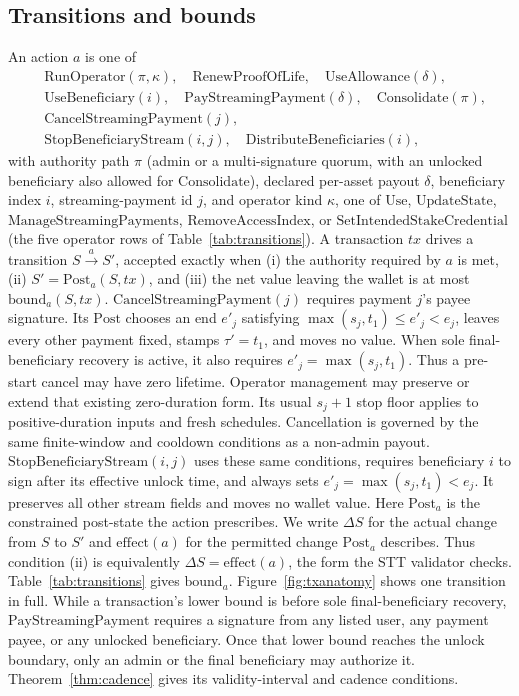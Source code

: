 \documentclass[11pt,DIV=11,parskip=half-]{scrartcl}
\begin{document}
\subsection{Transitions and bounds}
\begin{definition}[Transition]
An action $a$ is one of
\[
\begin{aligned}
&\mathrm{RunOperator}(\pi, \kappa),\quad \mathrm{RenewProofOfLife},\quad \mathrm{UseAllowance}(\delta),\\
&\mathrm{UseBeneficiary}(i),\quad \mathrm{PayStreamingPayment}(\delta),\quad \mathrm{Consolidate}(\pi),\\
&\mathrm{CancelStreamingPayment}(j),\\
&\mathrm{StopBeneficiaryStream}(i,j),\quad \mathrm{DistributeBeneficiaries}(i),
\end{aligned}
\]
with authority path $\pi$ (admin or a multi-signature quorum, with an unlocked beneficiary also allowed for $\mathrm{Consolidate}$), declared per-asset payout $\delta$, beneficiary index $i$, streaming-payment id $j$, and operator kind $\kappa$, one of $\mathrm{Use}$, $\mathrm{UpdateState}$, $\mathrm{ManageStreamingPayments}$, $\mathrm{RemoveAccessIndex}$, or $\mathrm{SetIntendedStakeCredential}$ (the five operator rows of Table~\ref{tab:transitions}). A transaction $\mathit{tx}$ drives a transition $S \xrightarrow{a} S'$, accepted exactly when (i) the authority required by $a$ is met, (ii) $S' = \mathrm{Post}_a(S, \mathit{tx})$, and (iii) the net value leaving the wallet is at most $\mathrm{bound}_a(S, \mathit{tx})$. $\mathrm{CancelStreamingPayment}(j)$ requires payment $j$'s payee signature. Its $\mathrm{Post}$ chooses an end $e'_j$ satisfying $\max(s_j,t_1) \le e'_j < e_j$, leaves every other payment fixed, stamps $\tau'=t_1$, and moves no value. When sole final-beneficiary recovery is active, it also requires $e'_j=\max(s_j,t_1)$. Thus a pre-start cancel may have zero lifetime. Operator management may preserve or extend that existing zero-duration form. Its usual $s_j+1$ stop floor applies to positive-duration inputs and fresh schedules. Cancellation is governed by the same finite-window and cooldown conditions as a non-admin payout. $\mathrm{StopBeneficiaryStream}(i,j)$ uses these same conditions, requires beneficiary $i$ to sign after its effective unlock time, and always sets $e'_j=\max(s_j,t_1)<e_j$. It preserves all other stream fields and moves no wallet value. Here $\mathrm{Post}_a$ is the constrained post-state the action prescribes. We write $\Delta S$ for the actual change from $S$ to $S'$ and $\mathrm{effect}(a)$ for the permitted change $\mathrm{Post}_a$ describes. Thus condition (ii) is equivalently $\Delta S = \mathrm{effect}(a)$, the form the STT validator checks. Table~\ref{tab:transitions} gives $\mathrm{bound}_a$. Figure~\ref{fig:txanatomy} shows one transition in full. While a transaction's lower bound is before sole final-beneficiary recovery, $\mathrm{PayStreamingPayment}$ requires a signature from any listed user, any payment payee, or any unlocked beneficiary. Once that lower bound reaches the unlock boundary, only an admin or the final beneficiary may authorize it. Theorem~\ref{thm:cadence} gives its validity-interval and cadence conditions.
\end{definition}
\end{document}
